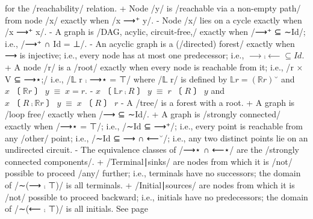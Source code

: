 \documentclass[11pt]{article}
\begin{document}
for the /reachability/ relation.  + Node /y/ is /reachable via a non-empty path/ from node /x/ exactly when /x ⟶⁺ y/.  \quad - Node /x/ lies on a cycle exactly when /x ⟶⁺ x/.  \quad - A graph is /DAG, acylic, circuit-free,/ exactly when /⟶⁺ ⊆ ∼Id/; i.e., /⟶⁺ ∩ Id = ⊥/.  \quad - An acyclic graph is a (/directed) forest/ exactly when ⟶ is injective; i.e.,  \quad  \quad every node has at most one predecessor; i.e., $⟶ ⨾ ⟵ ⊆ Id$. + A node /r/ is a /root/ exactly when every node is reachable from it; i.e., /{r} × V ⊆ ⟶⋆;/  \quad i.e., /𝕃 r ⨾ ⟶⋆ = ⊤/ where /𝕃 r/ is defined by $𝕃 r = (ℝ r)˘$ and $x 〔ℝ r〕 y \;≡\; x = r$.  \quad - $x〔𝕃 r ⨾ R〕 y \;≡\; r〔R〕 y$ and $x 〔R ⨾ ℝ r〕 y \;≡\; x 〔R〕 r$  \quad - A /tree/ is a forest with a root. + A graph is /loop free/ exactly when /⟶ ⊆ ∼Id/. + A graph is /strongly connected/ exactly when /⟶⋆ = ⊤/; i.e., /∼Id ⊆ ⟶⁺/;  \quad i.e., every point is reachable from any /other/ point; i.e., /∼Id ⊆ ⟶ ∩ ⟵˘/;  \quad i.e., any two distinct points lie on an undirected circuit.  \quad - The equivalence classes of /⟶⋆ ∩ ⟵⋆/ are the /strongly connected components/. + /Terminal∣sinks/ are nodes from which it is /not/ possible to proceed /any/ further;  \quad i.e., terminals have no successors; the domain of /∼(⟶ ⨾ ⊤)/ is all terminals. + /Initial∣sources/ are nodes from which it is /not/ possible to proceed backward;  \quad i.e., initials have no predecessors; the domain of /∼(⟵ ⨾ ⊤)/ is all initials. See page \pageref{org-special-block-extras-glossary-declaration-site-graph}
\end{document}
